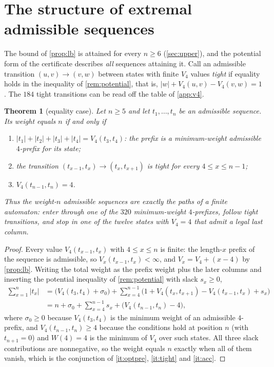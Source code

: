 \documentclass[11pt]{amsart}
\newtheorem{theorem}{Theorem}[section]
\theoremstyle{remark}
\begin{document}
\section{The structure of extremal admissible sequences}\label{sec:extremal}

The bound of \cref{prop:lb} is attained for every $n\ge 6$ (\cref{sec:upper}), and the potential form of the certificate describes \emph{all} sequences attaining it.  Call an admissible transition $(u,v)\to(v,w)$ between states with finite $V_4$ values \emph{tight} if equality holds in the inequality of \cref{rem:potential}, that is, $|w|+V_4(u,v)-V_4(v,w)=1$.  The $184$ tight transitions can be read off the table of \cref{app:v4}.

\begin{theorem}[equality case]\label{thm:extremal}
Let $n\ge 5$ and let $t_1,\dots,t_n$ be an admissible sequence.  Its weight equals $n$ if and only if
\begin{enumerate}[label=\textup{(\alph*)},leftmargin=2.5em]
\item\label{it:optpre} $|t_1|+|t_2|+|t_3|+|t_4|=V_4(t_3,t_4)$: the prefix is a minimum-weight admissible $4$-prefix for its state;
\item\label{it:tight} the transition $(t_{x-1},t_x)\to(t_x,t_{x+1})$ is tight for every $4\le x\le n-1$;
\item\label{it:acc} $V_4(t_{n-1},t_n)=4$.
\end{enumerate}
Thus the weight-$n$ admissible sequences are exactly the paths of a finite automaton: enter through one of the $320$ minimum-weight $4$-prefixes, follow tight transitions, and stop in one of the twelve states with $V_4=4$ that admit a legal last column.
\end{theorem}

\begin{proof}
Every value $V_4(t_{x-1},t_x)$ with $4\le x\le n$ is finite: the length-$x$ prefix of the sequence is admissible, so $V_x(t_{x-1},t_x)<\infty$, and $V_x=V_4+(x-4)$ by \cref{prop:lb}.  Writing the total weight as the prefix weight plus the later columns and inserting the potential inequality of \cref{rem:potential} with slack $s_x\ge 0$,
\begin{align*}
\sum_{x=1}^n|t_x| &= \Big(V_4(t_3,t_4)+\sigma_0\Big)+\sum_{x=4}^{n-1}\Big(1+V_4(t_x,t_{x+1})-V_4(t_{x-1},t_x)+s_x\Big)\\
&= n+\sigma_0+\sum_{x=4}^{n-1}s_x+\big(V_4(t_{n-1},t_n)-4\big),
\end{align*}
where $\sigma_0\ge 0$ because $V_4(t_3,t_4)$ is the minimum weight of an admissible $4$-prefix, and $V_4(t_{n-1},t_n)\ge 4$ because the conditions hold at position $n$ (with $t_{n+1}=0$) and $W(4)=4$ is the minimum of $V_4$ over such states.  All three slack contributions are nonnegative, so the weight equals $n$ exactly when all of them vanish, which is the conjunction of \ref{it:optpre}, \ref{it:tight} and \ref{it:acc}.
\end{proof}
\end{document}
